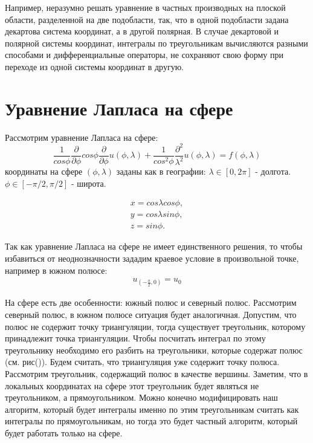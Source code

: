 \documentclass[a4paper]{article}
\begin{document}
Например, неразумно решать уравнение в частных производных на плоской
области, разделенной на две подобласти, так, что в одной подобласти
задана декартова система координат, а в другой полярная. В случае
декартовой и полярной системы координат, интегралы по треугольникам
вычисляются разными способами и дифференциальные
операторы, не сохраняют свою форму при переходе из одной системы
координат в другую.

\section*{Уравнение Лапласа на сфере}
Рассмотрим уравнение Лапласа на сфере:
\begin{equation*}
\frac{1}{cos\phi}\frac{\partial}{\partial\phi}
cos\phi\frac{\partial}{\partial\phi} u(\phi, \lambda) +
\frac{1}{cos^2\phi}\frac{\partial^2}
{\lambda^2} u(\phi, \lambda) = f(\phi, \lambda)
\end{equation*}
координаты на сфере $(\phi,\lambda)$ заданы как в географии:
$\lambda \in [0,2\pi]$ - долгота. $\phi \in [-\pi/2,\pi/2]$ - широта.

\begin{equation}\label{sphere_coord}
\begin{split}
x = cos \lambda cos \phi, \\
y = cos \lambda sin \phi, \\
z = sin \phi. 
\end{split}
\end{equation}

Так как уравнение Лапласа на сфере не имеет единственного решения, то
чтобы избавиться от неоднозначности зададим краевое условие в
произвольной точке, например в южном полюсе:
\begin{equation*}
\begin{split}
u_{(-\frac{\pi}{2},0)}=u_0
\end{split}
\end{equation*} 

На сфере есть две особенности: южный полюс и северный
полюс. Рассмотрим северный полюс, в южном полюсе ситуация будет
аналогичная. Допустим, что полюс не содержит точку триангуляции, тогда
существует треугольник, которому принадлежит точка триангуляции. Чтобы
посчитать интеграл по этому треугольнику необходимо его разбить на
треугольники, которые содержат полюс (см. рис()). Будем считать,
что триангуляция уже содержит точку полюса. Рассмотрим треугольник,
содержащий полюс в качестве вершины. Заметим, что в локальных
координатах на сфере этот треугольник будет являться не треугольником,
а прямоугольником. Можно конечно модифицировать наш алгоритм, который
будет интегралы именно по этим треугольникам считать как интегралы по
прямоугольникам, но тогда это будет частный алгоритм, который будет
работать только на сфере. 
\end{document}

